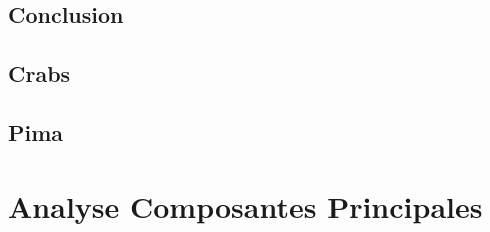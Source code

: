 \documentclass[]{report}
\begin{document}
\section{Conclusion}

\section{Crabs}

\section{Pima}

\chapter{Analyse Composantes Principales}
\end{document}
